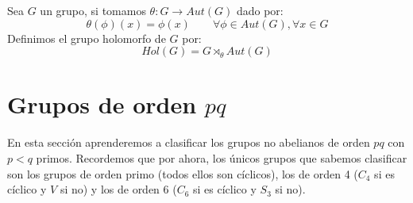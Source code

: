 \begin{definicion}
    Sea $G$ un grupo, si tomamos $\theta:G\to Aut(G)$ dado por:
    \begin{equation*}
        \theta(\phi)(x) = \phi(x) \qquad \forall \phi \in Aut(G), \forall x\in G
    \end{equation*}
    Definimos el grupo holomorfo de $G$ por:
    \begin{equation*}
        Hol(G) = G\rtimes_\theta Aut(G)
    \end{equation*}
\end{definicion}

\section{Grupos de orden $pq$}
\noindent
En esta sección aprenderemos a clasificar los grupos no abelianos de orden $pq$ con $p<q$ primos. Recordemos que por ahora, los únicos grupos que sabemos clasificar son los grupos de orden primo (todos ellos son cíclicos), los de orden 4 ($C_4$ si es cíclico y $V$ si no) y los de orden 6 ($C_6$ si es cíclico y $S_3$ si no).\\


